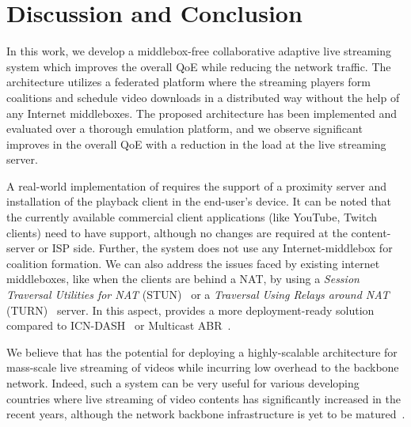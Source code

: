 \section{Discussion and Conclusion}
In this work, we develop a middlebox-free collaborative adaptive live streaming system which improves the overall QoE while reducing the network traffic. The architecture utilizes a federated platform where the streaming players form coalitions and schedule video downloads in a distributed way without the help of any Internet middleboxes. The proposed architecture has been implemented and evaluated over a thorough emulation platform, and we observe significant improves in the overall QoE with a reduction in the load at the live streaming server. 

A real-world implementation of {\our} requires the support of a proximity server and installation of the playback client in the end-user's device. It can be noted that the currently available commercial client applications (like YouTube, Twitch clients) need to have {\our} support, although no changes are required at the content-server or ISP side. Further, the system does not use any Internet-middlebox for coalition formation. We can also address the issues faced by existing internet middleboxes, like when the clients are behind a NAT, by using a \textit{Session Traversal Utilities for NAT} (STUN)~\cite{rfc5389_stun} or a \textit{Traversal Using Relays around NAT} (TURN)~\cite{rfc5766_turn} server. In this aspect, {\our} provides a more deployment-ready solution compared to ICN-DASH~\cite{ICN-DASH} or Multicast ABR~\cite{multicastAbrCablelabs}.

We believe that {\our} has the potential for deploying a highly-scalable architecture for mass-scale live streaming of videos while incurring low overhead to the backbone network. Indeed, such a system can be very useful for various developing countries where live streaming of video contents has significantly increased in the recent years, although the network backbone infrastructure is yet to be matured~\cite{kiedanski2019youtube}.
